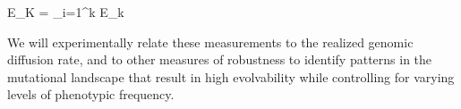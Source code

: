 E_{K} =  { \sum_{i=1}^{k}} E_k 


We will experimentally relate these measurements to the realized genomic diffusion rate, and to other measures of robustness to identify patterns in the mutational landscape that result in high evolvability while controlling for varying levels of phenotypic frequency.